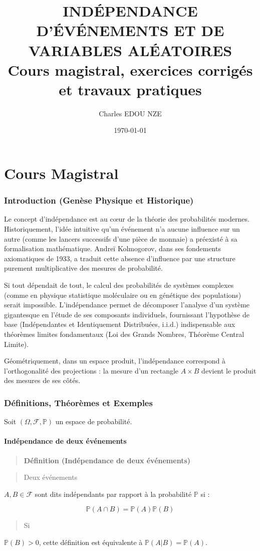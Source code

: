 \documentclass[11pt,a4paper]{article}
\title{\Huge INDÉPENDANCE D'ÉVÉNEMENTS ET DE VARIABLES ALÉATOIRES \\ \large Cours magistral, exercices corrigés et travaux pratiques}
\author{\Large Charles EDOU NZE}
\date{\today}
\begin{document}
\maketitle
\tableofcontents
\newpage

\part{Cours Magistral}



\section{Introduction (Genèse Physique et Historique)}

Le concept d'indépendance est au cœur de la théorie des probabilités modernes. Historiquement, l'idée intuitive qu'un événement n'a aucune influence sur un autre (comme les lancers successifs d'une pièce de monnaie) a préexisté à sa formalisation mathématique. Andreï Kolmogorov, dans ses fondements axiomatiques de 1933, a traduit cette absence d'influence par une structure purement multiplicative des mesures de probabilité.

Si tout dépendait de tout, le calcul des probabilités de systèmes complexes (comme en physique statistique moléculaire ou en génétique des populations) serait impossible. L'indépendance permet de décomposer l'analyse d'un système gigantesque en l'étude de ses composants individuels, fournissant l'hypothèse de base (Indépendantes et Identiquement Distribuées, i.i.d.) indispensable aux théorèmes limites fondamentaux (Loi des Grands Nombres, Théorème Central Limite).

Géométriquement, dans un espace produit, l'indépendance correspond à l'orthogonalité des projections : la mesure d'un rectangle $A \times B$ devient le produit des mesures de ses côtés.

\section{Définitions, Théorèmes et Exemples}

Soit $(\Omega, \mathcal{F}, \mathbb{P})$ un espace de probabilité.

\subsection{Indépendance de deux événements}

\begin{quote}
\textbf{Définition (Indépendance de deux événements)}
\end{quote}
\begin{quote}
Deux événements
\end{quote}$A, B \in \mathcal{F}$ sont dits indépendants par rapport à la probabilité $\mathbb{P}$ si :
\begin{quote}

\end{quote}$$\mathbb{P}(A \cap B) = \mathbb{P}(A) \mathbb{P}(B)$$
\begin{quote}
Si
\end{quote}$\mathbb{P}(B) > 0$, cette définition est équivalente à $\mathbb{P}(A|B) = \mathbb{P}(A)$.
\end{document}
